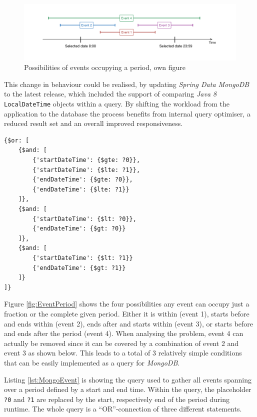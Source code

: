 \begin{figure}[h]
  	\centering
  	\includegraphics[width=0.9\linewidth]{./images/event-period.png}
  	\caption{Possibilities of events occupying a period, own figure}
	\label{fig:EventPeriod}
\end{figure}

This change in behaviour could be realised, by updating \emph{Spring Data MongoDB} to the latest release, which included the support of comparing \emph{Java 8} \texttt{LocalDateTime} objects within a query. By shifting the workload from the application to the database the process benefits from internal query optimiser, a reduced result set and an overall improved responsiveness. 

\begin{lstlisting}[caption ={MongoDB query for getting events over a period}, label=lst:MongoEvent]
{$or: [
	{$and: [
		{'startDateTime': {$gte: ?0}},
		{'startDateTime': {$lte: ?1}},
		{'endDateTime': {$gte: ?0}},
		{'endDateTime': {$lte: ?1}}
	]},
	{$and: [
		{'startDateTime': {$lt: ?0}},
		{'endDateTime': {$gt: ?0}}
	]},
	{$and: [
		{'startDateTime': {$lt: ?1}}
		{'endDateTime': {$gt: ?1}}
	]}
]}
\end{lstlisting}

Figure \vref{fig:EventPeriod} shows the four possibilities any event can occupy just a fraction or the complete given period. Either it is within (event 1), starts before and ends within (event 2), ends after and starts within (event 3), or starts before and ends after the period (event 4). When analysing the problem, event 4 can actually be removed since it can be covered by a combination of event 2 and event 3 as shown below. This leads to a total of 3 relatively simple conditions that can be easily implemented as a query for \emph{MongoDB}.

Listing \vref{lst:MongoEvent} is showing the query used to gather all events spanning over a period defined by a start and end time. Within the query, the placeholder \texttt{?0} and \texttt{?1} are replaced by the start, respectively end of the period during runtime. The whole query is a \enquote{OR}-connection of three different statements. 

